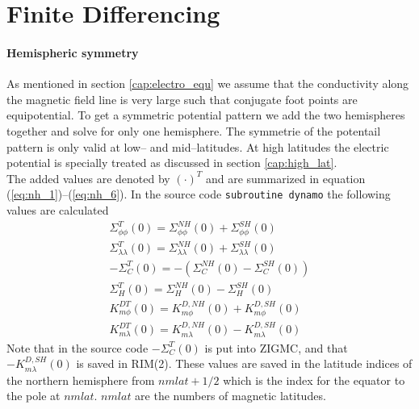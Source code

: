 \section{Finite Differencing}
%
\paragraph{Hemispheric symmetry}
%
As mentioned in section \ref{cap:electro_equ} we assume that the conductivity 
along the magnetic field line is
very large such that conjugate foot points are equipotential. To get a symmetric
potential pattern we add the two hemispheres together and solve for only one
hemisphere. The symmetrie of the potentail pattern is only valid at low-- and
mid--latitudes. At high latitudes the electric potential is specially treated as
discussed in section \ref{cap:high_lat}. \\
%
The added values are denoted by $(\cdot)^T$ and are summarized in equation 
(\ref{eq:nh_1})--(\ref{eq:nh_6}). In the source code 
\texttt{subroutine dynamo} the following values are calculated
%
\begin{align}
   \Sigma_{\phi \phi}^T(0)      = \Sigma_{\phi \phi}^{NH}(0) + \Sigma_{\phi \phi}^{SH}(0)\\
   \Sigma_{\lambda \lambda}^T(0)=\Sigma_{\lambda \lambda}^{NH}(0)+ \Sigma_{\lambda \lambda}^{SH}(0) \\
  -\Sigma_{C}^T(0)= -(\Sigma_{C}^{NH}(0)-\Sigma_{C}^{SH}(0))\\
   \Sigma_{H}^T(0)=   \Sigma_{H}^{NH}(0)-\Sigma_{H}^{SH}(0)\\
   K_{m \phi}^{DT}(0)    = K_{m \phi}^{D,NH}(0)+ K_{m \phi}^{D,SH}(0)\\
   K_{m \lambda}^{DT}(0) = K_{m \lambda}^{D,NH}(0)-K_{m \lambda}^{D,SH}(0)
\end{align}
%
Note that in the source code $-\Sigma_{C}^T(0)$ is put into ZIGMC, and that
$-K_{m \lambda}^{D,SH}(0)$ is saved in RIM(2). These values are saved in the latitude indices of
the northern hemisphere from $nmlat+1/2$ which is the index for the equator to
the pole at $nmlat$. $nmlat$ are the numbers of magnetic latitudes.
%
